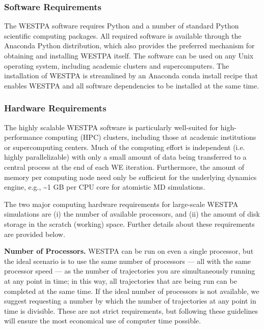 \documentclass[9pt,tutorial]{livecoms}
\begin{document}
\subsubsection{Software Requirements}

The WESTPA software requires Python and a number of standard Python scientific computing packages. 
All required software is available through the Anaconda Python distribution, which also provides the preferred mechanism for obtaining and installing WESTPA itself. 
The software can be used on any Unix operating system, including academic clusters and supercomputers. 
The installation of WESTPA is streamlined by an Anaconda conda install recipe that enables WESTPA and all software dependencies to be installed at the same time.

\subsubsection{Hardware Requirements}

The highly scalable WESTPA software is particularly well-suited for high-performance computing (HPC) clusters, including those at academic institutions or supercomputing centers. 
Much of the computing effort is independent (i.e. highly parallelizable) with only a small amount of data being transferred to a central process at the end of each WE iteration. 
Furthermore, the amount of memory per computing node need only be sufficient for the underlying dynamics engine, e.g., \textasciitilde 1 GB per CPU core for atomistic MD simulations. 

The two major computing hardware requirements for large-scale WESTPA simulations are (i) the number of available processors, and (ii) the amount of disk storage in the scratch (working) space. 
Further details about these requirements are provided below. 

\textbf{Number of Processors.} WESTPA can be run on even a single processor, but the ideal scenario is to use the same number of processors — all with the same processor speed — as the number of trajectories you are simultaneously running at any point in time; in this way, all trajectories that are being run can be completed at the same time. 
If the ideal number of processors is not available, we suggest requesting a number by which the number of trajectories at any point in time is divisible. 
These are not strict requirements, but following these guidelines will ensure the most economical use of computer time possible.
\end{document}
